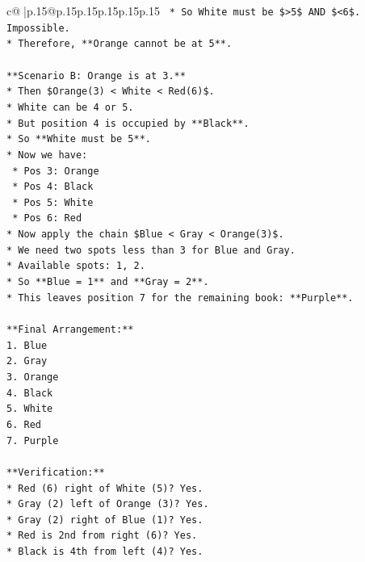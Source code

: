 \documentclass{article}
\begin{document}
{\begin{supertabular}{c@{$\;$}|p{.15\linewidth}@{}p{.15\linewidth}p{.15\linewidth}p{.15\linewidth}p{.15\linewidth}p{.15\linewidth}}
{{{\texttt{    *   So White must be \$>5\$ AND \$<6\$. Impossible.} \\
\texttt{*   Therefore, **Orange cannot be at 5**.} \\
\\ 
\texttt{**Scenario B: Orange is at 3.**} \\
\texttt{*   Then \$Orange(3) < White < Red(6)\$.} \\
\texttt{*   White can be 4 or 5.} \\
\texttt{*   But position 4 is occupied by **Black**.} \\
\texttt{*   So **White must be 5**.} \\
\texttt{*   Now we have:} \\
\texttt{    *   Pos 3: Orange} \\
\texttt{    *   Pos 4: Black} \\
\texttt{    *   Pos 5: White} \\
\texttt{    *   Pos 6: Red} \\
\texttt{*   Now apply the chain \$Blue < Gray < Orange(3)\$.} \\
\texttt{*   We need two spots less than 3 for Blue and Gray.} \\
\texttt{*   Available spots: 1, 2.} \\
\texttt{*   So **Blue = 1** and **Gray = 2**.} \\
\texttt{*   This leaves position 7 for the remaining book: **Purple**.} \\
\\ 
\texttt{**Final Arrangement:**} \\
\texttt{1.  Blue} \\
\texttt{2.  Gray} \\
\texttt{3.  Orange} \\
\texttt{4.  Black} \\
\texttt{5.  White} \\
\texttt{6.  Red} \\
\texttt{7.  Purple} \\
\\ 
\texttt{**Verification:**} \\
\texttt{*   Red (6) right of White (5)? Yes.} \\
\texttt{*   Gray (2) left of Orange (3)? Yes.} \\
\texttt{*   Gray (2) right of Blue (1)? Yes.} \\
\texttt{*   Red is 2nd from right (6)? Yes.} \\
\texttt{*   Black is 4th from left (4)? Yes.} \\
}}}
\end{supertabular}}
\end{document}
